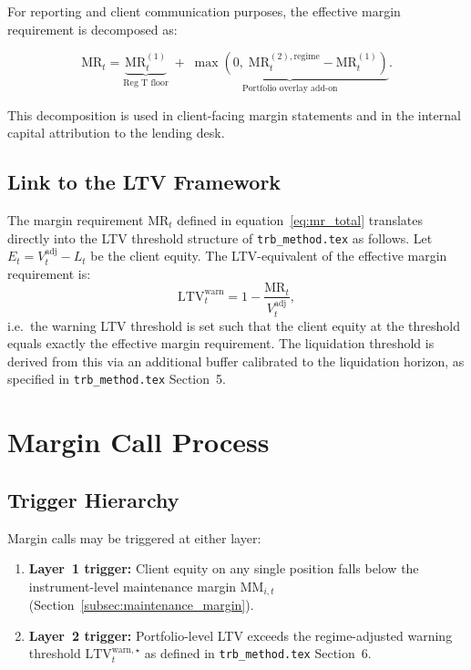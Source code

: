 \documentclass[12pt, a4paper]{article}
\newcommand{\MR}{\mathrm{MR}}
\newcommand{\MM}{\mathrm{MM}}
\newcommand{\LTV}{\mathrm{LTV}}
\begin{document}
For reporting and client communication purposes, the effective margin
requirement is decomposed as:

\begin{equation}
    \MR_t = \underbrace{\MR_t^{(1)}}_{\text{Reg T floor}}
    \;+\;
    \underbrace{\max\!\left(0,\; \MR_t^{(2),\mathrm{regime}} - \MR_t^{(1)}\right)}_{\text{Portfolio overlay add-on}}.
    \label{eq:mr_decomp}
\end{equation}

\noindent This decomposition is used in client-facing margin statements and
in the internal capital attribution to the lending desk.

\subsection{Link to the LTV Framework}

The margin requirement $\MR_t$ defined in equation~\eqref{eq:mr_total}
translates directly into the LTV threshold structure of \texttt{trb\_method.tex}
as follows. Let $E_t = V_t^{\mathrm{adj}} - L_t$ be the client equity. The
LTV-equivalent of the effective margin requirement is:
\begin{equation}
    \LTV^{\mathrm{warn}}_t
    = 1 - \frac{\MR_t}{V_t^{\mathrm{adj}}},
    \label{eq:ltv_link}
\end{equation}
i.e.\ the warning LTV threshold is set such that the client equity at
the threshold equals exactly the effective margin requirement. The
liquidation threshold is derived from this via an additional buffer
calibrated to the liquidation horizon, as specified in
\texttt{trb\_method.tex} Section~5.

\section{Margin Call Process}
\label{sec:margin_call}

\subsection{Trigger Hierarchy}

Margin calls may be triggered at either layer:
\begin{enumerate}[leftmargin=1.5em]
    \item \textbf{Layer~1 trigger:} Client equity on any single position falls
    below the instrument-level maintenance margin $\MM_{i,t}$ (Section~\ref{subsec:maintenance_margin}).
    \item \textbf{Layer~2 trigger:} Portfolio-level LTV exceeds the
    regime-adjusted warning threshold $\LTV^{\mathrm{warn},\star}_t$ as
    defined in \texttt{trb\_method.tex} Section~6.
\end{enumerate}
\end{document}

